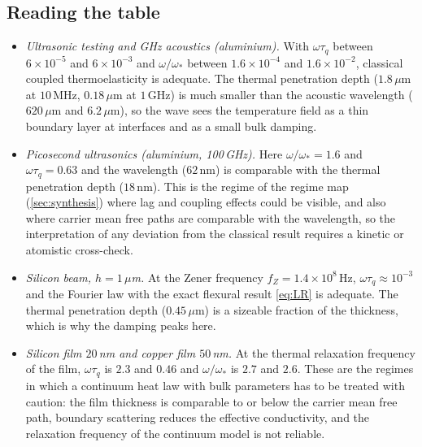 \subsection{Reading the table}
\begin{itemize}
\item \emph{Ultrasonic testing and GHz acoustics (aluminium).} With $\omega\tau_q$ between $6\times10^{-5}$ and $6\times10^{-3}$ and $\omega/\omega_*$ between $1.6\times10^{-4}$ and $1.6\times10^{-2}$, classical coupled thermoelasticity is adequate. The thermal penetration depth ($1.8\,\mu$m at $10$\,MHz, $0.18\,\mu$m at $1$\,GHz) is much smaller than the acoustic wavelength ($620\,\mu$m and $6.2\,\mu$m), so the wave sees the temperature field as a thin boundary layer at interfaces and as a small bulk damping.
\item \emph{Picosecond ultrasonics (aluminium, 100\,GHz).} Here $\omega/\omega_*=1.6$ and $\omega\tau_q=0.63$ and the wavelength ($62$\,nm) is comparable with the thermal penetration depth ($18$\,nm). This is the regime of the regime map (\cref{sec:synthesis}) where lag and coupling effects could be visible, and also where carrier mean free paths are comparable with the wavelength, so the interpretation of any deviation from the classical result requires a kinetic or atomistic cross-check.
\item \emph{Silicon beam, $h=1\,\mu$m.} At the Zener frequency $f_Z=1.4\times10^{8}$\,Hz, $\omega\tau_q\approx10^{-3}$ and the Fourier law with the exact flexural result \cref{eq:LR} is adequate. The thermal penetration depth ($0.45\,\mu$m) is a sizeable fraction of the thickness, which is why the damping peaks here.
\item \emph{Silicon film $20$\,nm and copper film $50$\,nm.} At the thermal relaxation frequency of the film, $\omega\tau_q$ is $2.3$ and $0.46$ and $\omega/\omega_*$ is $2.7$ and $2.6$. These are the regimes in which a continuum heat law with bulk parameters has to be treated with caution: the film thickness is comparable to or below the carrier mean free path, boundary scattering reduces the effective conductivity, and the relaxation frequency of the continuum model is not reliable.
\end{itemize}

